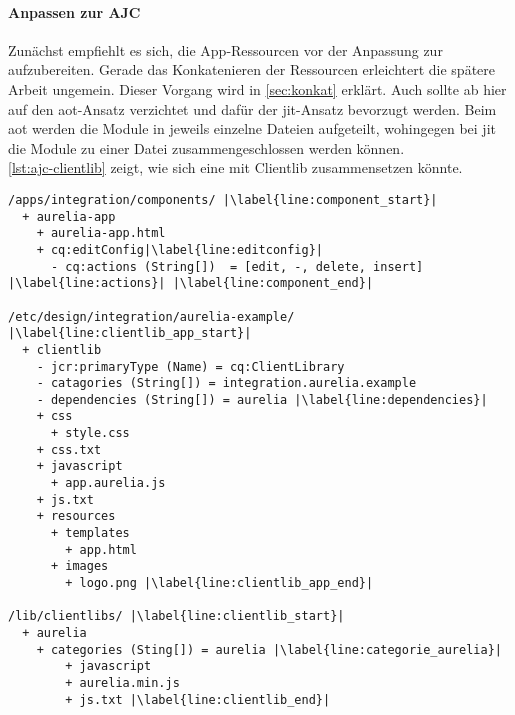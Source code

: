 \paragraph{Anpassen zur AJC}
Zunächst empfiehlt es sich, die App-Ressourcen vor der Anpassung zur \ajc aufzubereiten. Gerade das Konkatenieren der Ressourcen erleichtert die spätere Arbeit ungemein. Dieser Vorgang wird in \autoref{sec:konkat} erklärt. Auch sollte ab hier auf den \ac{aot}-Ansatz verzichtet und dafür der \ac{jit}-Ansatz bevorzugt werden. Beim \ac{aot} werden die Module in jeweils einzelne Dateien aufgeteilt, wohingegen bei \ac{jit} die Module zu einer Datei zusammengeschlossen werden können. \\
\autoref{lst:ajc-clientlib} zeigt, wie sich eine \ajc mit Clientlib zusammensetzen könnte.

\begin{lstlisting}[style=jcr, caption=Eine Beispiel-AJC mit Clientlib, label=lst:ajc-clientlib,escapechar=|]
/apps/integration/components/ |\label{line:component_start}|
  + aurelia-app
    + aurelia-app.html
    + cq:editConfig|\label{line:editconfig}|
      - cq:actions (String[])  = [edit, -, delete, insert] |\label{line:actions}| |\label{line:component_end}|

/etc/design/integration/aurelia-example/ |\label{line:clientlib_app_start}|
  + clientlib
    - jcr:primaryType (Name) = cq:ClientLibrary
    - catagories (String[]) = integration.aurelia.example
    - dependencies (String[]) = aurelia |\label{line:dependencies}|
    + css
      + style.css
    + css.txt
    + javascript
      + app.aurelia.js
    + js.txt
    + resources
      + templates
        + app.html
      + images
        + logo.png |\label{line:clientlib_app_end}|
    
/lib/clientlibs/ |\label{line:clientlib_start}|
  + aurelia
  	+ categories (Sting[]) = aurelia |\label{line:categorie_aurelia}|
    	+ javascript
      	+ aurelia.min.js
    	+ js.txt |\label{line:clientlib_end}|
\end{lstlisting}

